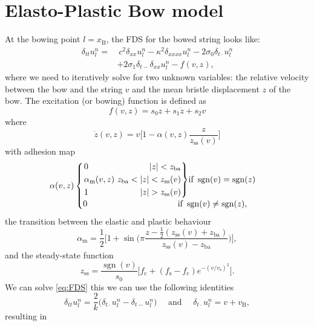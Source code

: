 \documentclass[twoside,a4paper]{article}
\newenvironment{rcases}
  {\left.\begin{alignedat}{2}}
  {\end{alignedat}\right\rbrace}
\DeclareMathOperator{\sgn}{sgn}
\begin{document}
\section{Elasto-Plastic Bow model}

At the bowing point $l=x_\text{B}$, the FDS for the bowed string looks like:
\begin{equation}
    \begin{aligned}
    \label{eq:FDS}
        \delta_{tt} u_l^n = &\: c^2 \delta_{xx} u_l^n -\kappa^2\delta_{xxxx} u_l^n - 2\sigma_0\delta_{t\cdot} u_l^n
        \\ 
        &+ 2\sigma_1\delta_{t-}\delta_{xx}u_l^n - f(v, z),
    \end{aligned}
\end{equation}
where we need to iteratively solve for two unknown variables: the relative velocity between the bow and the string $v$ and the mean bristle displacement $z$ of the bow.
The excitation (or bowing) function is defined as
\begin{equation}
    f(v, z) = s_0z + s_1\dot z + s_2v
\end{equation}
where 
\begin{equation}\label{eq:zdot}
    \dot z(v, z) = v\bigg[1-\alpha(v, z)\frac{z}{z_\text{ss}(v)}\bigg]
\end{equation}
with adhesion map
\begin{equation}
\alpha(v, z) 
    \begin{cases}
    \begin{rcases}
        &0 & |z| < z_\text{ba}\\
       &\alpha_\text{m}(v,z)&\  z_\text{ba}<|z|<z_\text{ss}(v)\\
        &1 &|z|>z_\text{ss}(v)
        \end{rcases}\text{if}\  \sgn(v)=\sgn(z)\\
        0\hspace{107pt}\text{if}\  \sgn(v)\neq\sgn(z),
    \end{cases}
\end{equation}
the transition between the elastic and plastic behaviour
\begin{equation}
    \alpha_\text{m} = \frac{1}{2}\bigg[1+\sin\bigg(\pi\frac{z-\frac{1}{2}(z_\text{ss}(v)+z_\text{ba})}{z_\text{ss}(v)-z_\text{ba}}\bigg)\bigg],
\end{equation}
and the steady-state function
\begin{equation}
    z_\text{ss} = \frac{\sgn(v)}{s_0}\Big[f_\text{c}+(f_\text{s}-f_\text{c})e^{-(v/v_\text{s})^2}\Big].
\end{equation}
We can solve \eqref{eq:FDS} this we can use the following identities
\begin{equation}
    \delta_{tt}u_l^n = \frac{2}{k}\big(\delta_{t\cdot}u_l^n-\delta_{t-}u_l^n\big) \quad \text{ and } \quad \delta_{t\cdot}u_l^n = v + v_\text{B},
\end{equation}
resulting in 
\end{document}
